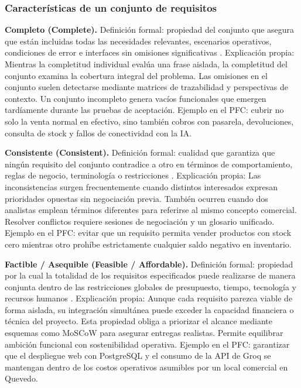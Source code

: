 \documentclass[onecolumn,12pt,a4paper]{IEEEtran}
\begin{document}
	\subsubsection*{Caracter\'isticas de un conjunto de requisitos}

	\textbf{Completo (Complete).} Definici\'on formal: propiedad del conjunto que asegura que est\'an incluidas todas las necesidades relevantes, escenarios operativos, condiciones de error e interfaces sin omisiones significativas \cite{iso29148,pohl2025}. Explicaci\'on propia: Mientras la completitud individual eval\'ua una frase aislada, la completitud del conjunto examina la cobertura integral del problema. Las omisiones en el conjunto suelen detectarse mediante matrices de trazabilidad y perspectivas de contexto. Un conjunto incompleto genera vac\'ios funcionales que emergen tard\'iamente durante las pruebas de aceptaci\'on. Ejemplo en el PFC: cubrir no solo la venta normal en efectivo, sino tambi\'en cobros con pasarela, devoluciones, consulta de stock y fallos de conectividad con la IA.

	\textbf{Consistente (Consistent).} Definici\'on formal: cualidad que garantiza que ning\'un requisito del conjunto contradice a otro en t\'erminos de comportamiento, reglas de negocio, terminolog\'ia o restricciones \cite{iso29148,ireb2023}. Explicaci\'on propia: Las inconsistencias surgen frecuentemente cuando distintos interesados expresan prioridades opuestas sin negociaci\'on previa. Tambi\'en ocurren cuando dos analistas emplean t\'erminos diferentes para referirse al mismo concepto comercial. Resolver conflictos requiere sesiones de negociaci\'on y un glosario unificado. Ejemplo en el PFC: evitar que un requisito permita vender productos con stock cero mientras otro proh\'ibe estrictamente cualquier saldo negativo en inventario.

	\textbf{Factible / Asequible (Feasible / Affordable).} Definici\'on formal: propiedad por la cual la totalidad de los requisitos especificados puede realizarse de manera conjunta dentro de las restricciones globales de presupuesto, tiempo, tecnolog\'ia y recursos humanos \cite{iso29148}. Explicaci\'on propia: Aunque cada requisito parezca viable de forma aislada, su integraci\'on simult\'anea puede exceder la capacidad financiera o t\'ecnica del proyecto. Esta propiedad obliga a priorizar el alcance mediante esquemas como MoSCoW para asegurar entregas realistas. Permite equilibrar ambici\'on funcional con sostenibilidad operativa. Ejemplo en el PFC: garantizar que el despliegue web con PostgreSQL y el consumo de la API de Groq se mantengan dentro de los costos operativos asumibles por un local comercial en Quevedo.
\end{document}
